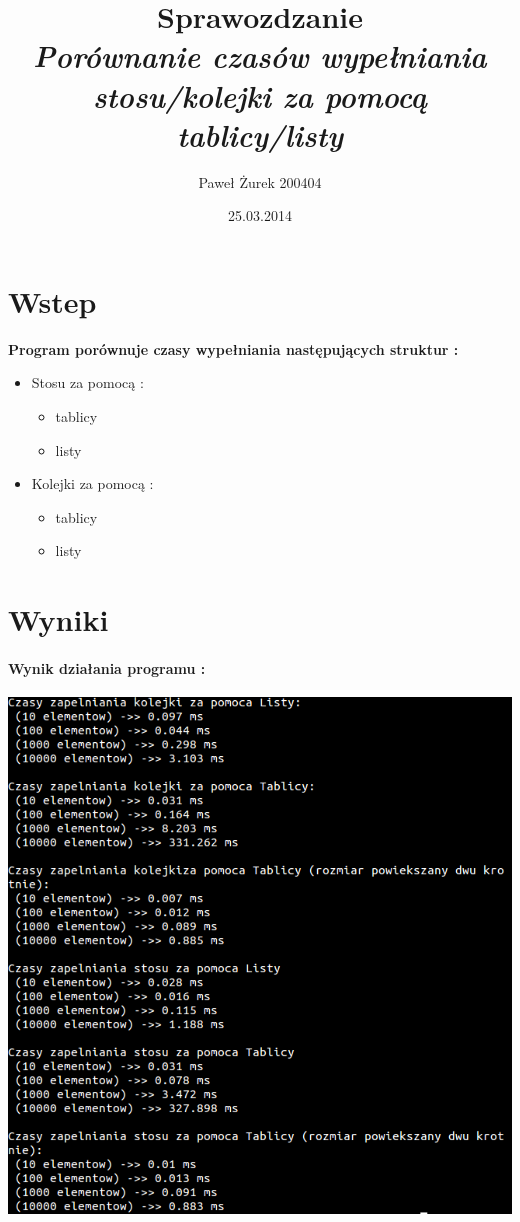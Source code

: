 \documentclass[10 pt]{article}
\title{Sprawozdzanie\\ \emph{\textbf{Porównanie czasów wypełniania stosu/kolejki za pomocą
tablicy/listy }}}
\author{Paweł Żurek 200404}
\date{25.03.2014}
\begin{document}
\tableofcontents
\maketitle
\section{Wstep}
\textbf{Program porównuje czasy wypełniania następujących struktur : }
\begin{itemize}
\item Stosu za pomocą :
\begin{itemize}
\item tablicy
\item listy
\end{itemize}
\item Kolejki za pomocą :
\begin{itemize}
\item tablicy
\item listy
\end{itemize}
\end{itemize}

\section{Wyniki}

\paragraph{Wynik działania programu  : \\}
\begin{center}
\includegraphics[scale=0.5]{dzialanie.png}
\end{center}
\newpage
\end{document}
